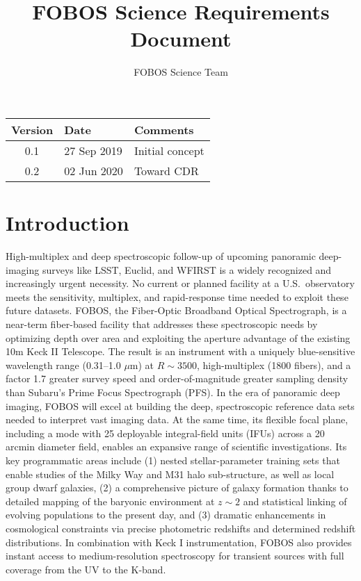 \documentclass[preprint,11pt]{aastex}
\title{FOBOS Science Requirements Document}
\author{FOBOS Science Team}
\begin{document}
\maketitle


\bigskip
\bigskip

\begin{table}[!h]
    \centering
    \begin{tabular}{|c|l|l|}
    \hline
    Version & Date & Comments \\
    \hline
        0.1 & 27 Sep 2019 & Initial concept \\
        0.2 & 02 Jun 2020 & Toward CDR \\
    \hline
    \end{tabular}
\end{table}

\newpage

\setcounter{tocdepth}{3}
\setcounter{secnumdepth}{3}
\tableofcontents

\newpage

\section{Introduction}
\label{srd:intro}

High-multiplex and deep spectroscopic follow-up of upcoming panoramic deep-imaging surveys like LSST, Euclid, and
WFIRST is a widely recognized and increasingly urgent necessity. No current or planned facility at a U.S.~observatory
meets the sensitivity, multiplex, and rapid-response time needed to exploit these future datasets. FOBOS, the
Fiber-Optic Broadband Optical Spectrograph, is a near-term fiber-based facility that addresses these spectroscopic
needs by optimizing depth over area and exploiting the aperture advantage of the existing 10m Keck II Telescope. The
result is an instrument with a uniquely blue-sensitive wavelength range (0.31--1.0 $\mu$m) at $R \sim 3500$,
high-multiplex (1800 fibers), and a factor 1.7 greater survey speed and order-of-magnitude greater sampling density
than Subaru's Prime Focus Spectrograph (PFS). In the era of panoramic deep imaging, FOBOS will excel at building the
deep, spectroscopic reference data sets needed to interpret vast imaging data. At the same time, its flexible focal
plane, including a mode with 25 deployable integral-field units (IFUs) across a 20 arcmin diameter field, enables an
expansive range of scientific investigations. Its key programmatic areas include (1) nested stellar-parameter training
sets that enable studies of the Milky Way and M31 halo sub-structure, as well as local group dwarf galaxies, (2) a
comprehensive picture of galaxy formation thanks to detailed mapping of the baryonic environment at $z \sim 2$ and
statistical linking of evolving populations to the present day, and (3) dramatic enhancements in cosmological
constraints via precise photometric redshifts and determined redshift distributions.  In combination with Keck I
instrumentation, FOBOS also provides instant access to medium-resolution spectroscopy for transient sources with full
coverage from the UV to the K-band.
\end{document}
